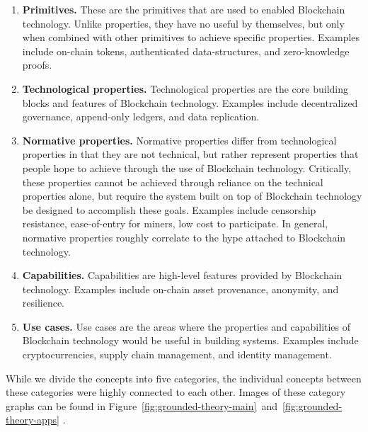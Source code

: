 \begin{enumerate}
	\item \textbf{Primitives.} These are the primitives that are used to enabled Blockchain technology. Unlike properties, they have no useful by themselves, but only when combined with other primitives to achieve specific properties. Examples include on-chain tokens, authenticated data-structures, and zero-knowledge proofs.
	
	\item \textbf{Technological properties.} Technological properties are the core building blocks and features of Blockchain technology. Examples include decentralized governance, append-only ledgers, and data replication.
	
	\item \textbf{Normative properties.} Normative properties differ from technological properties in that they are not technical, but rather represent properties that people hope to achieve through the use of Blockchain technology. Critically, these properties cannot be achieved through reliance on the technical properties alone, but require the system built on top of Blockchain technology be designed to accomplish these goals. Examples include censorship resistance, ease-of-entry for miners, low cost to participate.
	In general, normative properties roughly correlate to the hype attached to Blockchain technology.

	\item \textbf{Capabilities.} Capabilities are high-level features provided by Blockchain technology. Examples include on-chain asset provenance, anonymity, and resilience.
	
	\item \textbf{Use cases.} Use cases are the areas where the properties and capabilities of Blockchain technology would be useful in building systems. Examples include cryptocurrencies, supply chain management, and identity management.
\end{enumerate}

While we divide the concepts into five categories, the individual concepts between these categories were highly connected to each other.
Images of these category graphs can be found in Figure~\ref{fig:grounded-theory-main}~and~\ref{fig:grounded-theory-apps} .

